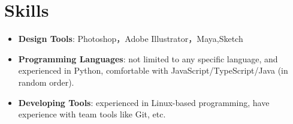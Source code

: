\documentclass{resume}
\newcommand{\en}[1]{#1}
\newcommand{\zh}[1]{}
\begin{document}
\section{\en{Skills}\zh{技能}}
\begin{itemize}[parsep=0.25ex]
      \item \en{\textbf{Design Tools}:
                  Photoshop，Adobe Illustrator，Maya,Sketch}
            \zh{\textbf{设计软件}:
                  Photoshop，Adobe Illustrator，Maya,Sketch}
                  
      \item \en{\textbf{Programming Languages}:
                  not limited to any specific language,
                  and experienced in Python,
                  comfortable with JavaScript/TypeScript/Java (in random order).}
            \zh{\textbf{编程语言}:
                  不局限于特定编程语言，且尤其熟悉 JavaScript 等，
                  了解 Java/Python/TypeScript 等（不分先后）。}

      \item \en{\textbf{Developing Tools}:
                  experienced in Linux-based programming,
                  have experience with team tools like Git, etc.}
            \zh{\textbf{开发工具}:
                  十分熟悉 Linux，有 Git 等团队合作工具的经验。}
\end{itemize}
\end{document}
